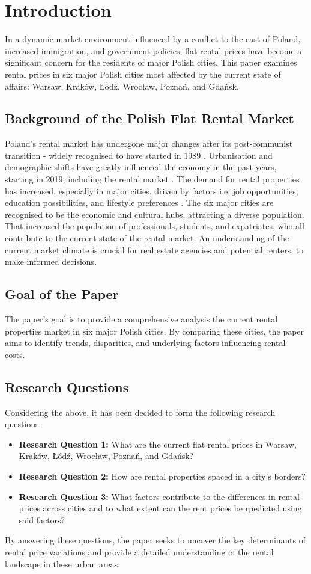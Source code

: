 \section{Introduction}
In a dynamic market environment influenced by a conflict to the east of Poland, increased immigration, and government policies, flat rental prices have become a significant concern for the residents of major Polish cities. This paper examines rental prices in six major Polish cities most affected by the current state of affairs: Warsaw, Kraków, Łódź, Wrocław, Poznań, and Gdańsk.

\subsection{Background of the Polish Flat Rental Market}
Poland's rental market has undergone major changes after its post-communist transition - widely recognised to have started in 1989 \cite{noauthor_25_2014}. Urbanisation and demographic shifts have greatly influenced the economy in the past years, starting in 2019, including the rental market \cite{ouanes_chapter_nodate}. The demand for rental properties has increased, especially in major cities, driven by factors i.e. job opportunities, education possibilities, and lifestyle preferences \cite{kazmierczak_korekta_2024}. The six major cities are recognised to be the economic and cultural hubs, attracting a diverse population. That increased the population of professionals, students, and expatriates, who all contribute to the current state of the rental market. An understanding of the current market climate is crucial for real estate agencies and potential renters, to make informed decisions.

\subsection{Goal of the Paper}
The paper's goal is to provide a comprehensive analysis the current rental properties market in six major Polish cities. By comparing these cities, the paper aims to identify trends, disparities, and underlying factors influencing rental costs.

\subsection{Research Questions}
Considering the above, it has been decided to form the following research questions:
\begin{itemize}
    \item \textbf{Research Question 1:} What are the current flat rental prices in Warsaw, Kraków, Łódź, Wrocław, Poznań, and Gdańsk?
    \item \textbf{Research Question 2:} How are rental properties spaced in a city's borders?
    \item \textbf{Research Question 3:} What factors contribute to the differences in rental prices across cities and to what extent can the rent prices be rpedicted using said factors?
\end{itemize}
By answering these questions, the paper seeks to uncover the key determinants of rental price variations and provide a detailed understanding of the rental landscape in these urban areas.

